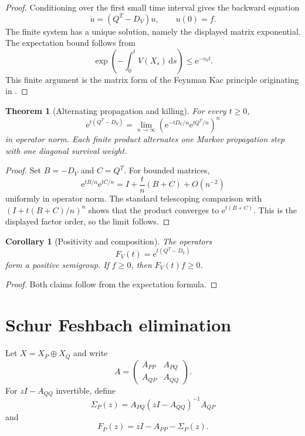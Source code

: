 \documentclass[11pt,letterpaper]{article}
\newtheorem{theorem}{Theorem}[section]
\theoremstyle{plain}
\theoremstyle{plain}
\theoremstyle{plain}
\newtheorem{corollary}[corollary]{Corollary}
\theoremstyle{definition}
\theoremstyle{definition}
\theoremstyle{definition}
\theoremstyle{definition}
\theoremstyle{definition}
\theoremstyle{remark}
\theoremstyle{remark}
\theoremstyle{remark}
\theoremstyle{remark}
\theoremstyle{remark}
\theoremstyle{remark}
\newcommand{\e}{\mathrm e}
\newcommand{\dd}{\,\mathrm d}
\let\KomorebiPrimitivemathrm\mathrm
\renewcommand{\mathrm}[1]{{\KomorebiPrimitivemathrm{#1}}}
\begin{document}
\begin{proof}
Conditioning over the first small time interval gives the backward equation
\[
\dot u=(Q^T-D_V)u,
\qquad
u(0)=f.
\]
The finite system has a unique solution, namely the displayed matrix exponential. The expectation bound follows from
\[
\exp\left(-\int_0^tV(X_s)\dd s\right)
\leq
\e^{-v_0t}.
\]
This finite argument is the matrix form of the Feynman Kac principle originating in \cite{Kac1949}.
\end{proof}

\begin{theorem}[Alternating propagation and killing]\label{extended:record:083}\label{extended:thm:feynman_kac_product}
For every \(t\geq0\),
\[
\e^{t(Q^T-D_V)}
=
\lim_{n\to\infty}
\left(
\e^{-tD_V/n}\e^{tQ^T/n}
\right)^n
\]
in operator norm. Each finite product alternates one Markov propagation step with one diagonal survival weight.
\end{theorem}

\begin{proof}
Set \(B=-D_V\) and \(C=Q^T\). For bounded matrices,
\[
\e^{tB/n}\e^{tC/n}
=
I+\frac{t}{n}(B+C)+O(n^{-2})
\]
uniformly in operator norm. The standard telescoping comparison with
\(
(I+t(B+C)/n)^n
\)
shows that the product converges to \(\e^{t(B+C)}\). This is the displayed factor order, so the limit follows.
\end{proof}

\begin{corollary}[Positivity and composition]\label{extended:record:084}\label{extended:cor:feynman_kac_semigroup}
The operators
\[
F_V(t)=\e^{t(Q^T-D_V)}
\]
form a positive semigroup. If \(f\geq0\), then \(F_V(t)f\geq0\).
\end{corollary}

\begin{proof}
Both claims follow from the expectation formula.
\end{proof}

\FloatBarrier
\section{Schur Feshbach elimination}\label{extended:section:14}\label{extended:sec:feshbach}

Let \(X=X_P\oplus X_Q\) and write
\[
A=
\begin{pmatrix}
A_{PP}&A_{PQ}\\
A_{QP}&A_{QQ}
\end{pmatrix}.
\]
For \(zI-A_{QQ}\) invertible, define
\[
\Sigma_P(z)
=
A_{PQ}(zI-A_{QQ})^{-1}A_{QP}
\]
and
\[
F_P(z)
=
zI-A_{PP}-\Sigma_P(z).
\]
\end{document}
